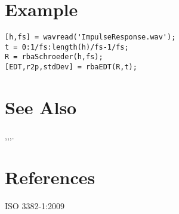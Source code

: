 

\section{Example} %
\label{sec:rbaEDT_example}

\begin{lstlisting}[style=nonumbers]
[h,fs] = wavread('ImpulseResponse.wav');
t = 0:1/fs:length(h)/fs-1/fs;
R = rbaSchroeder(h,fs);
[EDT,r2p,stdDev] = rbaEDT(R,t);
\end{lstlisting}

\section{See Also} %
\label{sec:rbaEDT_see_also}

\texttt{},\quad \texttt{},\quad \texttt{},\quad \texttt{}.


\section{References} %
\label{sec:rbaEDT_references}
ISO 3382-1:2009


